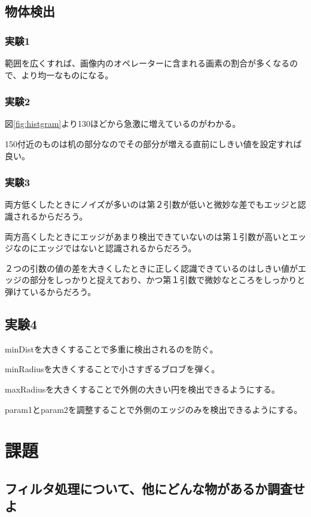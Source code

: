 \documentclass{jlreq}
\begin{document}
\subsection{物体検出}
\subsubsection{実験1}

範囲を広くすれば、画像内のオペレーターに含まれる画素の割合が多くなるので、より均一なものになる。

\subsubsection{実験2}

図\ref{fig:histgram}より130ほどから急激に増えているのがわかる。

150付近のものは机の部分なのでその部分が増える直前にしきい値を設定すれば良い。

\subsubsection{実験3}

両方低くしたときにノイズが多いのは第２引数が低いと微妙な差でもエッジと認識されるからだろう。

両方高くしたときにエッジがあまり検出できていないのは第１引数が高いとエッジなのにエッジではないと認識されるからだろう。

２つの引数の値の差を大きくしたときに正しく認識できているのはしきい値がエッジの部分をしっかりと捉えており、かつ第１引数で微妙なところをしっかりと弾けているからだろう。

\subsection{実験4}

minDistを大きくすることで多重に検出されるのを防ぐ。

minRadiusを大きくすることで小さすぎるブロブを弾く。

maxRadiusを大きくすることで外側の大きい円を検出できるようにする。

param1とparam2を調整することで外側のエッジのみを検出できるようにする。

\section{課題}
\subsection{フィルタ処理について、他にどんな物があるか調査せよ}
\end{document}
